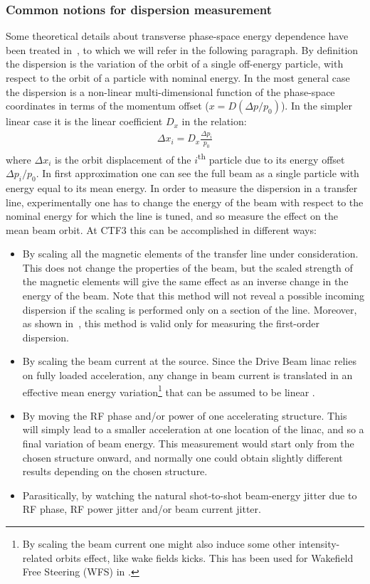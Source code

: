 \subsubsection{Common notions for dispersion measurement}
\label{sub:detailDispMeas}
%
Some theoretical details about transverse phase-space energy dependence have been treated
in~\cite{bib:DavideThesis}, to which we will refer in the following paragraph.
By definition~\cite{Minty_Zimmermann_Book} the dispersion is the variation of the orbit of a single
off-energy particle, with respect to the orbit of a particle with nominal energy.
In the most general case the dispersion is a non-linear multi-dimensional function of the
phase-space coordinates in terms of the momentum offset ($x = D(\Delta p/p_0)$).
In the simpler linear case it is the linear coefficient $D_x$ in the relation:
\begin{align}
\Delta x_i = D_x \frac{\Delta p_i}{p_0}
\label{eq:simpleLinearDispersionDefinition}
\end{align}
where $\Delta x_i$ is the orbit displacement of the $i$\textsuperscript{th} particle due
to its energy offset $\Delta p_i/p_0$.
In first approximation one can see the full beam as a single particle with energy equal to
its mean energy.  
In order to measure the dispersion in a transfer line, experimentally one has to change
the energy of the beam with respect to the nominal energy for which the line is tuned,
and so measure the effect on the mean beam orbit.
At CTF3 this can be accomplished in different ways:
%
\begin{itemize}
\item
By scaling all the magnetic elements of the transfer line under consideration. This does
not change the properties of the beam, but the scaled strength of the magnetic elements
will give the same effect as an inverse change in the energy of the beam. 
Note that this method will not reveal a possible incoming dispersion if the scaling is
performed only on a section of the line.
Moreover, as shown in~\cite{bib:DavideThesis}, this method is valid only for measuring
the first-order dispersion.
\item
By scaling the beam current at the source. Since the Drive Beam linac relies on fully
loaded acceleration, any change in beam current is translated in an effective mean energy
variation\footnote{By scaling the beam current one might also induce some other
intensity-related orbits effect, like wake fields kicks. This has been used for Wakefield
Free Steering (WFS) in \cite{Latina:2014jca, Latina:2014ama}.} that can be assumed to be
linear \cite{bib:CTF3DesignReport}.
\item
By moving the RF phase and/or power of one accelerating structure. This will simply lead
to a smaller acceleration at one location of the linac, and so a final variation of beam
energy. This measurement would start only from the chosen structure onward, and normally
one could obtain slightly different results depending on the chosen structure.
\item
Parasitically, by watching the natural shot-to-shot beam-energy jitter due to RF phase, 
RF power jitter and/or beam current jitter.
\end{itemize}
